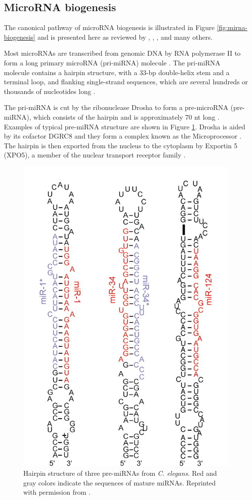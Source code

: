 



\subsection{MicroRNA biogenesis}\label{microrna-biogenesis}

The canonical pathway of microRNA biogenesis is illustrated in Figure
\ref{fig:mirna-biogenesis} and is presented here as reviewed by \citet{Bartel2004},
\citet{Melo2011}, \citet{Ha2014}, and many others. 

Most microRNAs are transcribed from genomic DNA by RNA polymerase II to form a
long primary microRNA (pri-miRNA) molecule \citep{Lee2004}. The pri-miRNA molecule
contains a hairpin structure, with a 33-bp double-helix stem and a terminal
loop, and flanking single-strand sequences, which are several hundreds or
thousands of nucleotides long \citep{Kim2005}.

The pri-miRNA is cut by the ribonuclease Drosha to form
a pre-microRNA (pre-miRNA), which consists of the hairpin and is approximately
70 nt long \citep{Lee2003}. Examples of typical pre-miRNA structure are shown in Figure
\ref{fig:premirna-structure}. Drosha is aided by its cofactor DGRC8
and they form a complex known as the Microprocessor \citep{Gregory2004}.
The hairpin is then exported from the nucleus to the cytoplasm by Exportin 5
(XPO5), a member of the nuclear transport receptor family \citep{Lund2004}.

\begin{figure}[htb]
  \centering
  \includegraphics[width=0.4\linewidth]{figures/premiRNA_structure.png}
  \caption{Hairpin structure of three pre-miRNAs from \emph{C. elegans}.
  Red and gray colors indicate the sequences of mature miRNAs.
  Reprinted with permission from \citep{Bartel2004}.}
  \label{fig:premirna-structure}
\end{figure}

